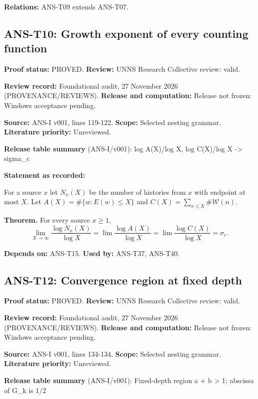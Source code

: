 \documentclass[
  11pt,
]{article}
\begin{document}
\textbf{Relations:} ANS-T09 extends ANS-T07.

\hypertarget{ans-t10-growth-exponent-of-every-counting-function}{%
\subsection{ANS-T10: Growth exponent of every counting
function}\label{ans-t10-growth-exponent-of-every-counting-function}}

\textbf{Proof status:} PROVED. \textbf{Review:} UNNS Research Collective
review: valid.

\textbf{Review record:} Foundational audit, 27 November 2026
(PROVENANCE/REVIEWS). \textbf{Release and computation:} Release not
frozen: Windows acceptance pending.

\textbf{Source:} ANS-I v001, lines 119-122. \textbf{Scope:} Selected
nesting grammar. \textbf{Literature priority:} Unreviewed.

\textbf{Release table summary} (ANS-I/v001): log A(X)/log X, log
C(X)/log X -\textgreater{} sigma\_c

\textbf{Statement as recorded:}

For a source \(x\) let \(N_x(X)\) be the number of histories from \(x\)
with endpoint at most \(X\). Let \(A(X)=\#\{w:E(w)\le X\}\) and
\(C(X)=\sum_{n\le X}\#\mathcal W(n)\).

\textbf{Theorem.} For every source \(x\ge1\),
\[\lim_{X\to\infty}\frac{\log N_x(X)}{\log X}=\lim\frac{\log A(X)}{\log X}=\lim\frac{\log C(X)}{\log X}=\sigma_c .\]

\textbf{Depends on:} ANS-T15. \textbf{Used by:} ANS-T37, ANS-T40.

\hypertarget{ans-t12-convergence-region-at-fixed-depth}{%
\subsection{ANS-T12: Convergence region at fixed
depth}\label{ans-t12-convergence-region-at-fixed-depth}}

\textbf{Proof status:} PROVED. \textbf{Review:} UNNS Research Collective
review: valid.

\textbf{Review record:} Foundational audit, 27 November 2026
(PROVENANCE/REVIEWS). \textbf{Release and computation:} Release not
frozen: Windows acceptance pending.

\textbf{Source:} ANS-I v001, lines 134-134. \textbf{Scope:} Selected
nesting grammar. \textbf{Literature priority:} Unreviewed.

\textbf{Release table summary} (ANS-I/v001): Fixed-depth region a + b
\textgreater{} 1; abscissa of G\_k is 1/2
\end{document}
